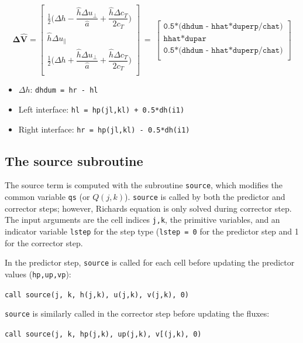 \documentclass{article}
\newcommand{\code}[1]{\texttt{#1}}
\begin{document}
 \[ \mathbf{\Delta \hat{V}} = 
\begin{bmatrix}
	\frac{1}{2} \bigg( \Delta h - \dfrac{\hat h \Delta u_{\perp} }{\hat a} +
	 \dfrac{\hat h \Delta c_T }{2  c_T}\bigg) \\[.2cm]
      \hat h \Delta u_\parallel   \\[.2cm]
   	\frac{1}{2} \bigg( \Delta h + \dfrac{\hat h \Delta u_{\perp} }{\hat a} +
	 \dfrac{\hat h \Delta c_T }{2  c_T}\bigg) 
	 \\
\end{bmatrix} \ =  \ 
\begin{bmatrix}
 \code{0.5*(dhdum - hhat*duperp/chat)}  \\[.2cm]
 \code{hhat*dupar}  \\[.2cm]
 \code{0.5*(dhdum - hhat*duperp/chat)}  \\
\end{bmatrix} 
\]

  \begin{itemize}
 	\item  $\Delta h$: \code{dhdum = hr - hl } 
 	\item  Left interface:   \code{hl = hp(jl,kl) + 0.5*dh(i1)}
  	\item  Right interface:   \code{hr = hp(jl,kl) - 0.5*dh(i1)}
 \end{itemize}
 

\subsection{The source subroutine}

 The source term is computed with the subroutine \code{source}, which modifies the common variable \code{qs} (or $Q(j,k)$).
  \code{source} is called by both the predictor and corrector steps; however, Richards equation is only solved during corrector step. 
 The input arguments are the  cell indices \code{j,k}, the primitive variables, and an indicator variable \code{lstep} for the step type (\code{lstep = 0} for the predictor step and 1 for the corrector step.		
 
In the predictor step, \code{source} is called for each cell before updating the predictor values (\code{hp,up,vp}):
\begin{center}
\code{call source(j, k, h(j,k), u(j,k), v(j,k), 0)}
\end{center}

 
\code{source} is similarly  called in the corrector step before updating the fluxes: 
\begin{center}
\code{call source(j, k, hp(j,k), up(j,k), v[(j,k), 0)}
\end{center}
\end{document}
